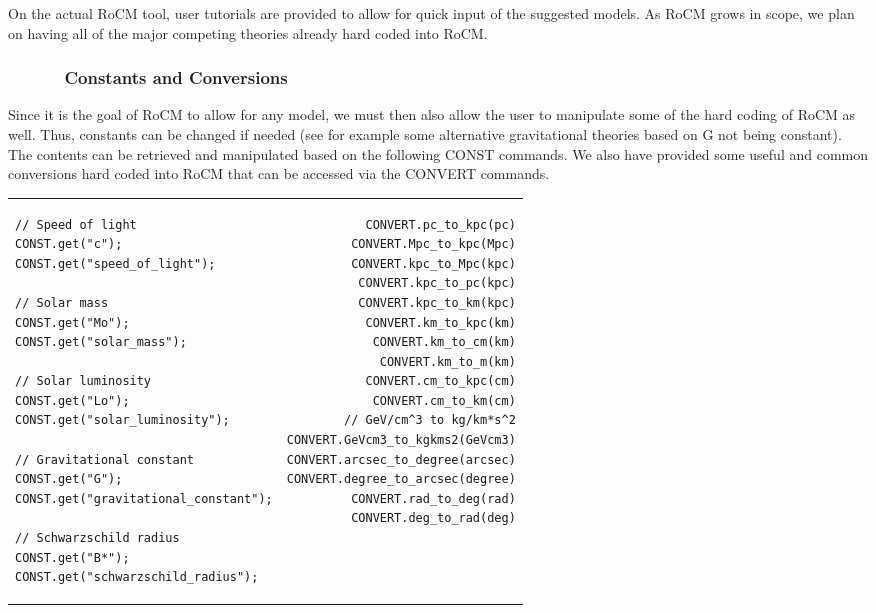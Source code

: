 \documentclass[conference]{IEEEtran-modified}
\begin{document}
On the actual RoCM tool, user tutorials are provided to allow for quick input of the suggested models.  As RoCM grows in scope, we plan on having all of the major competing theories already hard coded into RoCM.


\subsubsection{\ \ \ \ \ \ Constants and Conversions}
Since it is the goal of RoCM to allow for any model, we must then also allow the user to manipulate some of the hard coding of RoCM as well.  Thus, constants can be changed if needed (see for example some alternative gravitational theories based on G not being constant). The contents can be retrieved and manipulated based on the following CONST commands. We also have provided some useful and common conversions hard coded into RoCM that can be accessed via the CONVERT commands.\begin{center}
\begin{tabular}{l !{\color{lightgray}\vrule} r}
\begin{lstlisting}
// Speed of light
CONST.get("c");
CONST.get("speed_of_light");

// Solar mass
CONST.get("Mo");
CONST.get("solar_mass");

// Solar luminosity
CONST.get("Lo");
CONST.get("solar_luminosity");

// Gravitational constant
CONST.get("G");
CONST.get("gravitational_constant");

// Schwarzschild radius
CONST.get("B*");
CONST.get("schwarzschild_radius");
\end{lstlisting}
&
\begin{lstlisting}
CONVERT.pc_to_kpc(pc)
CONVERT.Mpc_to_kpc(Mpc)
CONVERT.kpc_to_Mpc(kpc)
CONVERT.kpc_to_pc(kpc)
CONVERT.kpc_to_km(kpc)
CONVERT.km_to_kpc(km)
CONVERT.km_to_cm(km)
CONVERT.km_to_m(km)
CONVERT.cm_to_kpc(cm)
CONVERT.cm_to_km(cm)
// GeV/cm^3 to kg/km*s^2
CONVERT.GeVcm3_to_kgkms2(GeVcm3)
CONVERT.arcsec_to_degree(arcsec)
CONVERT.degree_to_arcsec(degree)
CONVERT.rad_to_deg(rad)
CONVERT.deg_to_rad(deg)
\end{lstlisting}
\end{tabular}
\end{center}

\end{document}
